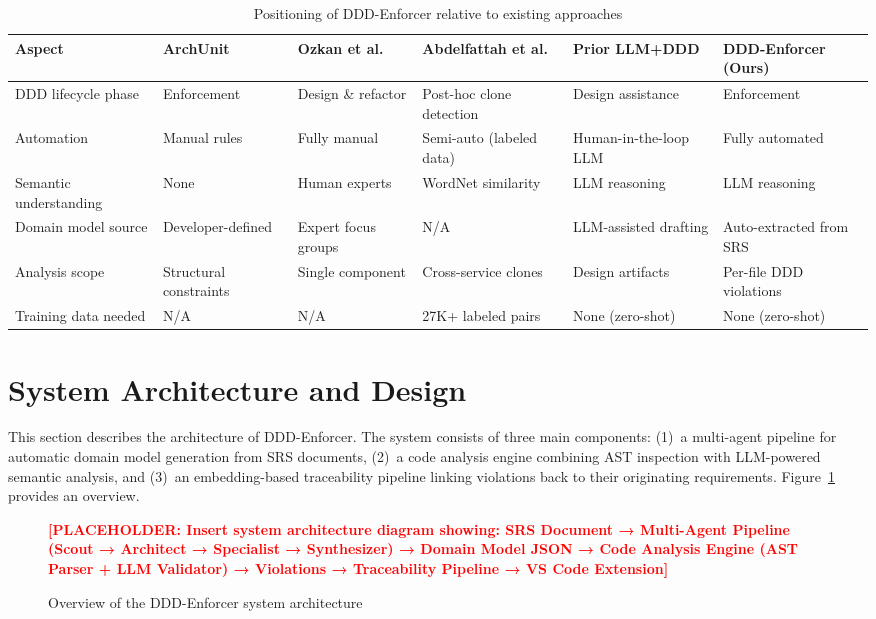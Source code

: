 \documentclass[smallextended]{svjour3}
\newcommand{\placeholder}[1]{\textcolor{red}{\textbf{[PLACEHOLDER: #1]}}}
\begin{document}
\begin{table}[t]
\caption{Positioning of DDD-Enforcer relative to existing approaches}
\label{tab:positioning}
\centering
\footnotesize
\begin{tabular}{p{2.2cm} p{1.7cm} p{1.7cm} p{1.7cm} p{1.8cm} p{2.0cm}}
\toprule
\textbf{Aspect} & \textbf{ArchUnit} & \textbf{Ozkan et al.} & \textbf{Abdelfattah et al.} & \textbf{Prior LLM+DDD} & \textbf{DDD-Enforcer (Ours)} \\
\midrule
DDD lifecycle phase & Enforcement & Design \& refactor & Post-hoc clone detection & Design assistance & Enforcement \\
Automation & Manual rules & Fully manual & Semi-auto (labeled data) & Human-in-the-loop LLM & Fully automated \\
Semantic understanding & None & Human experts & WordNet similarity & LLM reasoning & LLM reasoning \\
Domain model source & Developer-defined & Expert focus groups & N/A & LLM-assisted drafting & Auto-extracted from SRS \\
Analysis scope & Structural constraints & Single component & Cross-service clones & Design artifacts & Per-file DDD violations \\
Training data needed & N/A & N/A & 27K+ labeled pairs & None (zero-shot) & None (zero-shot) \\
\bottomrule
\end{tabular}
\end{table}

\section{System Architecture and Design}
\label{sec:architecture}

This section describes the architecture of DDD-Enforcer.
The system consists of three main components: (1)~a multi-agent pipeline for automatic domain model generation from SRS documents, (2)~a code analysis engine combining AST inspection with LLM-powered semantic analysis, and (3)~an embedding-based traceability pipeline linking violations back to their originating requirements.
Figure~\ref{fig:architecture} provides an overview.

\begin{figure}[t]
    \centering
    \placeholder{Insert system architecture diagram showing: SRS Document → Multi-Agent Pipeline (Scout → Architect → Specialist → Synthesizer) → Domain Model JSON → Code Analysis Engine (AST Parser + LLM Validator) → Violations → Traceability Pipeline → VS Code Extension}
    \caption{Overview of the DDD-Enforcer system architecture}
    \label{fig:architecture}
\end{figure}
\end{document}
